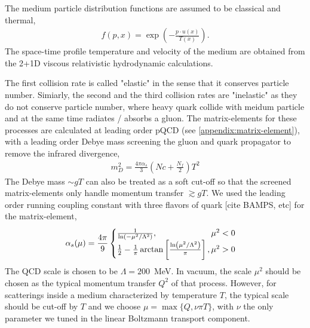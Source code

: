 \documentclass[aps, prc, reprint, amsmath, groupedaddress, nofootinbib]{revtex4-1}
\begin{document}
The medium particle distribution functions are assumed to be classical and thermal, 
\begin{eqnarray}
f(p,x) = \exp\left(-\frac{p \cdot u(x)}{T(x)}\right).
\end{eqnarray}
The space-time profile temperature and velocity of the medium are obtained from the 2+1D viscous relativistic hydrodynamic calculations.

The first collision rate is called "elastic" in the sense that it conserves particle number.
Simiarly, the second and the third collision rates are "inelastic" as they do not conserve particle number, where heavy quark collide with meidum particle and at the same time radiates / absorbs a gluon.
The matrix-elements for these processes are calculated at leading order pQCD (see \ref{appendix:matrix-element}), with a leading order Debye mass screening the gluon and quark propagator to remove the infrared divergence,
\begin{eqnarray}
m_D^2 = \frac{4\pi\alpha_s}{3}(Nc+\frac{N_f}{2})T^2
\end{eqnarray}
The Debye mass $\sim gT$ can also be treated as a soft cut-off so that the screened matrix-elements only handle momentum transfer $\gtrsim gT$.
We used the leading order running coupling constant with three flavors of quark [cite BAMPS, etc] for the matrix-element,
\begin{eqnarray}
\alpha_s(\mu) = \frac{4\pi}{9}
\begin{cases}
\frac{1}{\ln\left(-\mu^2/\Lambda^2\right)},\hfill \mu^2 < 0 \\ 
\frac{1}{2} - \frac{1}{\pi}\arctan\left[\frac{\ln\left(\mu^2/\Lambda^2\right)}{\pi}\right],\mu^2 > 0
\end{cases}
\end{eqnarray}
The QCD scale is chosen to be $\Lambda = 200$~MeV.
In vacuum, the scale $\mu^2$ should be chosen as the typical momentum transfer $Q^2$ of that process.
However, for scatterings inside a medium characterized by temperature $T$, the typical scale should be cut-off by $T$ and we choose $\mu = \max\{Q, \nu\pi T \}$, with $\nu$ the only parameter we tuned in the linear Boltzmann transport component.
\end{document}
